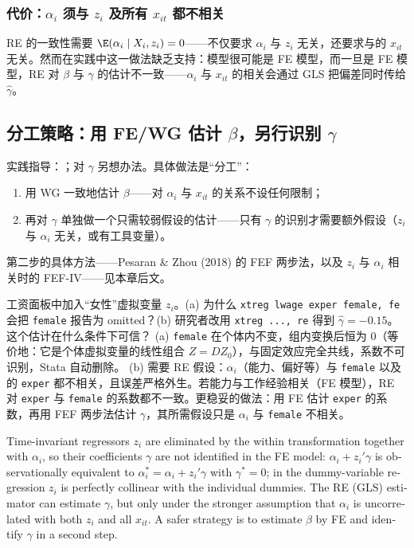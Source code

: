 \subsubsection{代价：\texorpdfstring{$\alpha_i$}{alpha\_i} 须与 \texorpdfstring{$z_i$}{z\_i} 及所有 \texorpdfstring{$x_{it}$}{x\_it} 都不相关}

RE 的一致性需要 $\E(\alpha_i\mid X_i,z_i)=0$——不仅要求 $\alpha_i$ 与 $z_i$ 无关，还要求与的 $x_{it}$ 无关。然而在实践中这一做法缺乏支持：模型很可能是 FE 模型，而一旦是 FE 模型，RE 对 $\beta$ 与 $\gamma$ 的估计不一致——$\alpha_i$ 与 $x_{it}$ 的相关会通过 GLS 把偏差同时传给 $\hat\gamma$。

\subsection{分工策略：用 FE/WG 估计 \texorpdfstring{$\beta$}{beta}，另行识别 \texorpdfstring{$\gamma$}{gamma}}

实践指导：；对 $\gamma$ 另想办法。具体做法是“分工”：
\begin{enumerate}
  \item 用 WG 一致地估计 $\beta$——对 $\alpha_i$ 与 $x_{it}$ 的关系不设任何限制；
  \item 再对 $\gamma$ 单独做一个只需较弱假设的估计——只有 $\gamma$ 的识别才需要额外假设（$z_i$ 与 $\alpha_i$ 无关，或有工具变量）。
\end{enumerate}
第二步的具体方法——Pesaran \& Zhou (2018) 的 FEF 两步法，以及 $z_i$ 与 $\alpha_i$ 相关时的 FEF-IV——见本章后文。

\begin{prac}\label{pr:U11a-female}
工资面板中加入“女性”虚拟变量 $z_i$。(a) 为什么 \texttt{xtreg lwage exper female, fe} 会把 \texttt{female} 报告为 omitted？(b) 研究者改用 \texttt{xtreg ..., re} 得到 $\hat\gamma=-0.15$。这个估计在什么条件下可信？
\answer
(a) \texttt{female} 在个体内不变，组内变换后恒为 0（等价地：它是个体虚拟变量的线性组合 $Z=DZ_0$），与固定效应完全共线，系数不可识别，Stata 自动删除。
(b) 需要 RE 假设：$\alpha_i$（能力、偏好等）与 \texttt{female} 以及的 \texttt{exper} 都不相关，且误差严格外生。若能力与工作经验相关（FE 模型），RE 对 \texttt{exper} 与 \texttt{female} 的系数都不一致。更稳妥的做法：用 FE 估计 \texttt{exper} 的系数，再用 FEF 两步法估计 $\gamma$，其所需假设只是 $\alpha_i$ 与 \texttt{female} 不相关。
\end{prac}

\begin{english}
Time-invariant regressors $z_i$ are eliminated by the within transformation together with $\alpha_i$, so their coefficients $\gamma$ are not identified in the FE model: $\alpha_i+z_i'\gamma$ is observationally equivalent to $\alpha_i^*=\alpha_i+z_i'\gamma$ with $\gamma^*=0$; in the dummy-variable regression $z_i$ is perfectly collinear with the individual dummies. The RE (GLS) estimator can estimate $\gamma$, but only under the stronger assumption that $\alpha_i$ is uncorrelated with both $z_i$ and all $x_{it}$. A safer strategy is to estimate $\beta$ by FE and identify $\gamma$ in a second step.
\end{english}

